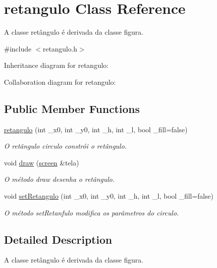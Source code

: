 \hypertarget{classretangulo}{}\section{retangulo Class Reference}
\label{classretangulo}


A classe retângulo é derivada da classe figura.  




{\ttfamily \#include $<$retangulo.\+h$>$}



Inheritance diagram for retangulo\+:


Collaboration diagram for retangulo\+:
\subsection*{Public Member Functions}
\begin{DoxyCompactItemize}
\item 
\hyperlink{classretangulo_a0c6f95a7beaf27bf44c46737da152d57}{retangulo} (int \+\_\+x0, int \+\_\+y0, int \+\_\+h, int \+\_\+l, bool \+\_\+fill=false)
\begin{DoxyCompactList}\small\item\em O retângulo circulo constrói o retângulo. \end{DoxyCompactList}\item 
void \hyperlink{classretangulo_aec48de654054e4ef2b0bd6c5d5b2d1a2}{draw} (\hyperlink{classscreen}{screen} \&tela)
\begin{DoxyCompactList}\small\item\em O método draw desenha o retângulo. \end{DoxyCompactList}\item 
void \hyperlink{classretangulo_a98e116adfecf0fddec5c7d8bed2df148}{set\+Retangulo} (int \+\_\+x0, int \+\_\+y0, int \+\_\+h, int \+\_\+l, bool \+\_\+fill=false)
\begin{DoxyCompactList}\small\item\em O método set\+Retanfulo modifica os parâmetros do circulo. \end{DoxyCompactList}\end{DoxyCompactItemize}


\subsection{Detailed Description}
A classe retângulo é derivada da classe figura. 


